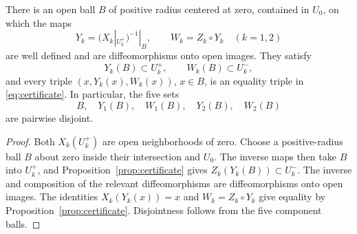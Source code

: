 \begin{lemma}\label{lem:common-ball}
There is an open ball \(B\) of positive radius centered at zero,
contained in \(U_0\), on which the maps
\[
 Y_k=(X_k|_{U_k^+})^{-1}|_B,\qquad W_k=Z_k\circ Y_k
 \quad(k=1,2)
\]
are well defined and are diffeomorphisms onto open images.
They satisfy
\[
 Y_k(B)\subset U_k^+,\qquad W_k(B)\subset U_k^-,
\]
and every triple \((x,Y_k(x),W_k(x))\), \(x\in B\), is an
equality triple in \eqref{eq:certificate}.
In particular, the five sets
\[
 B,\quad Y_1(B),\quad W_1(B),\quad Y_2(B),\quad W_2(B)
\]
are pairwise disjoint.
\end{lemma}

\begin{proof}
Both \(X_k(U_k^+)\) are open neighborhoods of zero. Choose
a positive-radius ball \(B\) about zero inside their intersection
and \(U_0\). The inverse maps then take \(B\) into \(U_k^+\),
and Proposition~\ref{prop:certificate} gives
\(Z_k(Y_k(B))\subset U_k^-\).
The inverse and composition of the relevant diffeomorphisms are
diffeomorphisms onto open images. The identities
\(X_k(Y_k(x))=x\) and \(W_k=Z_k\circ Y_k\) give equality by
Proposition~\ref{prop:certificate}. Disjointness follows from the
five component balls.
\end{proof}
